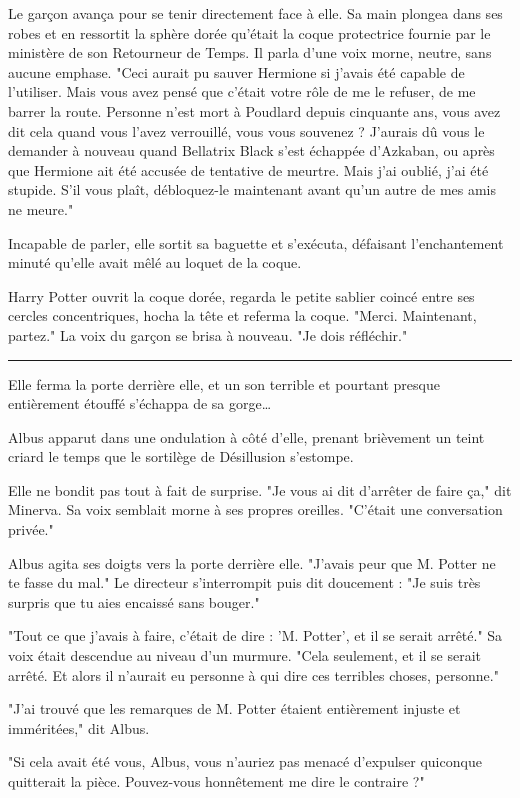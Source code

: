 Le garçon avança pour se tenir directement face à elle. Sa main plongea dans ses robes et en ressortit la sphère dorée qu'était la coque protectrice fournie par le ministère de son Retourneur de Temps. Il parla d'une voix morne, neutre, sans aucune emphase. "Ceci aurait pu sauver Hermione si j'avais été capable de l'utiliser. Mais vous avez pensé que c'était votre rôle de me le refuser, de me barrer la route. Personne n'est mort à Poudlard depuis cinquante ans, vous avez dit cela quand vous l'avez verrouillé, vous vous souvenez ? J'aurais dû vous le demander à nouveau quand Bellatrix Black s'est échappée d'Azkaban, ou après que Hermione ait été accusée de tentative de meurtre. Mais j'ai oublié, j'ai été stupide. S'il vous plaît, débloquez-le maintenant avant qu'un autre de mes amis ne meure."

Incapable de parler, elle sortit sa baguette et s'exécuta, défaisant l'enchantement minuté qu'elle avait mêlé au loquet de la coque.

Harry Potter ouvrit la coque dorée, regarda le petite sablier coincé entre ses cercles concentriques, hocha la tête et referma la coque. "Merci. Maintenant, partez." La voix du garçon se brisa à nouveau. "Je dois réfléchir."
\par\noindent\rule{\textwidth}{0.4pt}
Elle ferma la porte derrière elle, et un son terrible et pourtant presque entièrement étouffé s'échappa de sa gorge…

Albus apparut dans une ondulation à côté d'elle, prenant brièvement un teint criard le temps que le sortilège de Désillusion s'estompe.

Elle ne bondit pas tout à fait de surprise. "Je vous ai dit d'arrêter de faire ça," dit Minerva. Sa voix semblait morne à ses propres oreilles. "C'était une conversation privée."

Albus agita ses doigts vers la porte derrière elle. "J'avais peur que M. Potter ne te fasse du mal." Le directeur s'interrompit puis dit doucement : "Je suis très surpris que tu aies encaissé sans bouger."

"Tout ce que j'avais à faire, c'était de dire : 'M. Potter', et il se serait arrêté." Sa voix était descendue au niveau d'un murmure. "Cela seulement, et il se serait arrêté. Et alors il n'aurait eu personne à qui dire ces terribles choses, personne."

"J'ai trouvé que les remarques de M. Potter étaient entièrement injuste et imméritées," dit Albus.

"Si cela avait été vous, Albus, vous n'auriez pas menacé d'expulser quiconque quitterait la pièce. Pouvez-vous honnêtement me dire le contraire ?"

